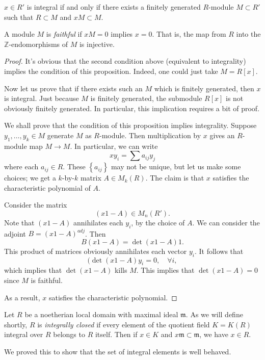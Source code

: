 \begin{proposition} 
$x \in R'$ is integral if and only if there exists a
 finitely generated $R$-module $M \subset R'$ such that $R \subset M$ and $xM \subset M$.
\end{proposition} 
A module $M$ is \emph{faithful} if $x M = 0$ implies $x=0$. That is, the map
from $R$ into the $\mathbb{Z}$-endomorphisms of $M$ is injective.
\begin{proof} 
It's obvious that the second condition above (equivalent to integrality) implies the condition of this
proposition. Indeed, one could just take $M = R[x]$.

Now let us prove that if there exists such an $M$ which is finitely generated,
then $x$ is integral. Just because $M$ is finitely generated, the
submodule $R[x]$ is not obviously finitely generated. In particular, this
implication  requires a bit of proof.


We shall prove that the condition of this proposition implies integrality.  
Suppose $y_1, \dots, y_k \in M$ generate $M$ as $R$-module. Then multiplication
by $x$ gives an $R$-module map $M \to M$. In particular, we can write
\[ xy_i = \sum a_{ij} y_j  \]
where each $a_{ij} \in R$.
These $\left\{a_{ij}\right\}$ may not be unique, but let us make some choices;
we get a $k$-by-$k$ matrix $A \in M_k(R)$. The claim is that $x$ satisfies the
characteristic polynomial of $A$.

Consider the matrix
\[ (x 1 - A) \in M_n(R').  \]
Note that $(x1-A)$ annihilates each $y_i$, by the choice of $A$.
We can consider the adjoint $B = (x1  -A)^{adj}$.  Then 
\[ B(x1 - A) = \det(x1 - A) 1.  \]
This product of matrices obviously annihilates each vector $y_i$.  It follows
that
\[ (\det(x1 - A) y_i = 0, \quad \forall i,  \]
which implies that $\det (x1-A)$ kills $M$. This implies that $\det (x1 -
A)=0$ since $M$ is faithful.

As a result, $x$ satisfies the characteristic polynomial.
\end{proof} 

\begin{exercise} 
Let $R$ be a noetherian
local domain with maximal ideal $\mathfrak{m}$. As we will define shortly, $R$
is \emph{integrally closed} if every element of the quotient field $K=K(R)$
integral over $R$ belongs to $R$ itself. Then if $x \in K$ and $x \mathfrak{m}
\subset \mathfrak{m}$, we have $x \in R$.
\end{exercise} 


We proved this to show that the set of integral elements is well behaved.

